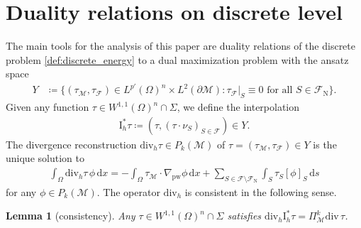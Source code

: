 \documentclass[a4paper]{amsart}
\numberwithin{equation}{section}
\renewcommand{\d}[1]{\,\mathrm{d}#1}
\renewcommand{\div}{\mathrm{div}}
\newcommand{\I}{\mathrm{I}}
\newcommand{\Mcal}{\mathcal{M}}
\newcommand{\pw}{\mathrm{pw}}
\newtheorem{lemma}[theorem]{Lemma}
\theoremstyle{remark}
\begin{document}
\section{Duality relations on discrete level}\label{sec:equivalence}
The main tools for the analysis of this paper are duality relations of the discrete problem \eqref{def:discrete_energy} to a dual maximization problem with the ansatz space
\begin{align*}
	Y &\coloneqq \{(\tau_\Mcal, \tau_\mathcal{F}) \in L^{p'}(\Omega)^n \times L^2(\partial \mathcal{M}) : \tau_\mathcal{F}|_S \equiv 0 \text{ for all } S \in \mathcal{F}_\mathrm{N}\}.
\end{align*}
Given any function $\tau \in W^{1,1}(\Omega)^n \cap \Sigma$,
we define the interpolation
\begin{align*}
	\mathrm{I}_h^* \tau \coloneqq (\tau, (\tau \cdot \nu_S)_{S \in \mathcal{F}}) \in Y.
\end{align*}
The divergence reconstruction $\div_h \tau \in P_{k}(\Mcal)$ of $\tau = (\tau_\Mcal, \tau_\mathcal{F}) \in Y$ is the unique solution to
\begin{align}\label{def:div-rec}
	\int_\Omega \div_h \tau\, \phi \d{x} = -\int_\Omega \tau_\Mcal \cdot \nabla_\pw \phi \d{x} + \sum_{S \in \mathcal{F} \setminus \mathcal{F}_\mathrm{N}} \int_S \tau_S [\phi]_S \d{s} 
\end{align}
for any $\phi \in P_{k}(\Mcal)$.
The operator $\div_h$ is consistent in the following sense.
\begin{lemma}[consistency]\label{lem:consistency}
	Any $\tau \in W^{1,1}(\Omega)^n \cap \Sigma$ satisfies
		$\div_h \I_h^* \tau = \Pi_\Mcal^k \div\, \tau$.
\end{lemma}
\end{document}
